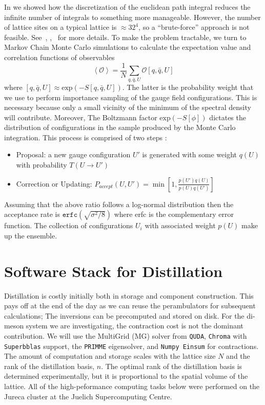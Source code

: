 In  we showed how the discretization of the euclidean path integral reduces the infinite number of integrals to something more manageable. However, the number of lattice sites on a typical lattice is $\approx32^4$, so a ``brute-force'' approach is not feasible. See~\cite{Montvay_Münster_1994}, \cite{Luscher:2010ae},\cite{Creutz:1988wv}~\cite{Finkenrath:2023sjg} for more details. To make the problem tractable, we turn to Markov Chain Monte Carlo simulations to calculate the expectation value and correlation functions of observables 
\begin{equation}
  \left<\mathcal{O}\right> = \frac{1}{N} \sum_{q,\bar{q},U}^{} \mathcal{O}\left[q,\bar{q},U\right] 
\end{equation} where $\left[q,\bar{q},U\right] \approx \text{exp}(-S[q,\bar{q},U])$. The latter is the probability weight that we use to perform importance sampling of the gauge field configurations. This is necessary because only a small vicinity of the minimum of the spectral density will contribute. Moreover, The Boltzmann factor $\text{exp}(-S[\phi])$ dictates the distribution of configurations in the sample produced by the Monte Carlo integration. This process is comprised of two steps \cite{Luscher:2010ae}: 
\begin{itemize}
  \item Proposal: a new gauge configuration $U'$ is generated with some weight $q(U)$ with probability $T(U \to U')$ 
  \item Correction or Updating: $P_{accept}(U,U') = \min \left[1,\frac{p(U')q(U)}{p(U)q(U')}\right]$
\end{itemize} 
Assuming that the above ratio follows a log-normal distribution then the acceptance rate is $\texttt{erfc}\left(\sqrt{\sigma^2/8}\right)$ where erfc is the complementary error function. The collection of configurations $U_i$ with associated weight $p(U)$ make up the ensemble. 


\section{Software Stack for Distillation}
Distillation is costly initially both in storage and component construction. This pays off at the end of the day as we can reuse the perambulators for subsequent calculations; The inversions can be precomputed and stored on disk. For the di-meson system we are investigating, the contraction cost is not the dominant contribution. We will use the MultiGrid (MG) solver from \texttt{QUDA}, \texttt{Chroma} with \texttt{Superbblas} support, the \texttt{PRIMME} eigensolver, and \texttt{Numpy Einsum} for contractions. The amount of computation and storage scales with the lattice size $N$ and the rank of the distillation basis, $n$. The optimal rank of the distillation basis is determined experimentally, but it is proportional to the spatial volume of the lattice. All of the high-peformance computing tasks below were performed on the Jureca cluster at the Juelich Supercomputing Centre. 
